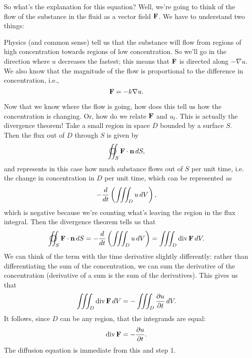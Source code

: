 So what's the explanation for this equation? Well, we're going to think of the flow of the substance in the fluid as a vector field $\boldsymbol{\mathbf{F}}$. We have to understand two things:
\ben
\item Physics (and common sense) tell us that the substance will flow from regions of high concentration towards regions of low concentration. So we'll go in the direction where $u$ decreases the fastest; this means that $\boldsymbol{\mathbf{F}}$ is directed along $-\nabla u$. We also know that the magnitude of the flow is proportional to the difference in concentration, i.e.,
\[ \boldsymbol{\mathbf{F}} = -k\nabla u. \]
\item Now that we know where the flow is going, how does this tell us how the concentration is changing. Or, how do we relate $\boldsymbol{\mathbf{F}}$ and $u_t$. This is actually the divergence theorem! Take a small region in space $D$ bounded by a surface $S$. Then the flux out of $D$ through $S$ is given by
\[ \oiint_S \vF \cdot \vn \, dS, \]
and represents in this case how much substance flows out of $S$ per unit time, i.e. the change in concentration in $D$ per unit time, which can be represented as
\[ -\frac{d }{dt} \left(\iiint_D u\,dV\right), \]
which is negative because we're counting what's leaving the region in the flux integral. Then the divergence theorem tells us that
\[ \oiint_S \vF \cdot \vn \, dS = -\drv{ }t \left(\iiint_D u\,dV\right) = \iiint_D \divg \vF \,dV. \]
We can think of the term with the time derivative slightly differently: rather than differentiating the sum of the concentration, we can sum the derivative of the concentration (derivative of a sum is the sum of the derivatives). This gives us that
\[ \iiint_D \mathrm{div}\, \boldsymbol{\mathbf{F}} \,dV = -\iiint_D \frac{\partial u}{\partial t} \, dV. \]
It follows, since $D$ can be any region, that the integrands are equal:
\[ \mathrm{div}\, \boldsymbol{\mathbf{F}} = -\frac{\partial u}{\partial t}. \]
The diffusion equation is immediate from this and step 1.
\een


